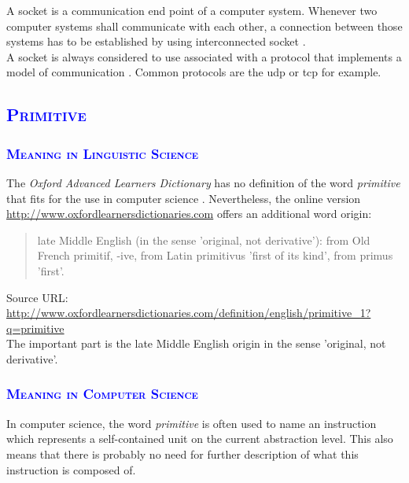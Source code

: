 \documentclass[xcolor=dvipsnames]{article}
\begin{document}
A socket is a communication end point of a computer system. Whenever two computer systems shall communicate with each other, a connection between those systems has to be established by using interconnected socket \cite[p. 553, ch. 6.5.2]{computer_networks}.\\

\noindent A socket is always considered to use associated with a protocol that implements a model of communication \cite[p. 427 - 428, ch. 16]{GNU_C_library_manual}. Common protocols are the \gls{udp} or \gls{tcp} for example.

\subsection{\scshape{\textcolor{blue}{Primitive}}}

\subsubsection{\scshape{\textcolor{blue}{Meaning in Linguistic Science}}}

\noindent The \textit{Oxford Advanced Learners Dictionary} has no definition of the word \textit{primitive} that fits for the use in computer science \cite[p. 1197]{oxford_dictionary}. Nevertheless, the online version \url{http://www.oxfordlearnersdictionaries.com} offers an additional word origin:

\begin{quote}
late Middle English (in the sense 'original, not derivative'): from Old French primitif, -ive, from Latin primitivus 'first of its kind', from primus 'first'.
\end{quote}

\noindent \small{Source URL: \url{http://www.oxfordlearnersdictionaries.com/definition/english/primitive_1?q=primitive}}\\

\noindent The important part is the late Middle English origin in the sense 'original, not derivative'.

\subsubsection{\scshape{\textcolor{blue}{Meaning in Computer Science}}}

In computer science, the word \textit{primitive} is often used to name an instruction which represents a self-contained unit on the current abstraction level. This also means that there is probably no need for further description of what this instruction is composed of.\\
\end{document}
